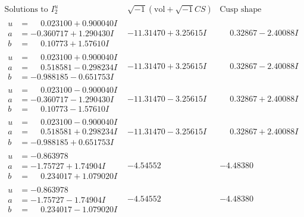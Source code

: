 \documentclass[1p]{elsarticle_modified}
\theoremstyle{definition}
\newcommand{\I}{\sqrt{-1}}
\begin{document}
$$\begin{array}{c|c|c}  
\text{Solutions to }I^u_{2}& \I (\text{vol} + \sqrt{-1}CS) & \text{Cusp shape}\\
 \hline 
\begin{aligned}
u &= \phantom{-}0.023100 + 0.900040 I \\
a &= -0.360717 + 1.290430 I \\
b &= \phantom{-}0.10773 + 1.57610 I\end{aligned}
 & -11.31470 + 3.25615 I & \phantom{-}0.32867 - 2.40088 I \\ \hline\begin{aligned}
u &= \phantom{-}0.023100 + 0.900040 I \\
a &= \phantom{-}0.518581 - 0.298234 I \\
b &= -0.988185 - 0.651753 I\end{aligned}
 & -11.31470 + 3.25615 I & \phantom{-}0.32867 - 2.40088 I \\ \hline\begin{aligned}
u &= \phantom{-}0.023100 - 0.900040 I \\
a &= -0.360717 - 1.290430 I \\
b &= \phantom{-}0.10773 - 1.57610 I\end{aligned}
 & -11.31470 - 3.25615 I & \phantom{-}0.32867 + 2.40088 I \\ \hline\begin{aligned}
u &= \phantom{-}0.023100 - 0.900040 I \\
a &= \phantom{-}0.518581 + 0.298234 I \\
b &= -0.988185 + 0.651753 I\end{aligned}
 & -11.31470 - 3.25615 I & \phantom{-}0.32867 + 2.40088 I \\ \hline\begin{aligned}
u &= -0.863978\phantom{ +0.000000I} \\
a &= -1.75727 + 1.74904 I \\
b &= \phantom{-}0.234017 + 1.079020 I\end{aligned}
 & -4.54552\phantom{ +0.000000I} & -4.48380\phantom{ +0.000000I} \\ \hline\begin{aligned}
u &= -0.863978\phantom{ +0.000000I} \\
a &= -1.75727 - 1.74904 I \\
b &= \phantom{-}0.234017 - 1.079020 I\end{aligned}
 & -4.54552\phantom{ +0.000000I} & -4.48380\phantom{ +0.000000I} \\ \hline\begin{aligned}

\end{aligned}
\end{array}$$
\end{document}
